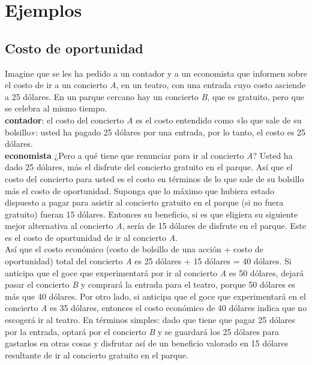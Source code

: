 \section{Ejemplos}

\subsection{Costo de oportunidad}


Imagine que se les ha pedido a un contador y a un economista que informen sobre el costo de ir a un concierto \textit{A}, en un teatro, con una entrada cuyo costo asciende a 25 dólares. En un parque cercano hay un concierto \textit{B}, que es gratuito, pero que se celebra al mismo tiempo.
\\

\textbf{contador}:
el costo del concierto \textit{A} es el costo entendido como «lo que sale de su bolsillo»: usted ha pagado 25 dólares por una entrada, por lo tanto, el costo es 25 dólares.
\\

\textbf{economista}
¿Pero a qué tiene que renunciar para ir al concierto \textit{A}? Usted ha dado 25 dólares, más el disfrute del concierto gratuito en el parque. Así que el costo del concierto para usted es el costo en términos de lo que sale de su bolsillo más el costo de oportunidad.
Suponga que lo máximo que hubiera estado dispuesto a pagar para asistir al concierto gratuito en el parque (si no fuera gratuito) fueran 15 dólares. Entonces su beneficio, si es que eligiera su siguiente mejor alternativa al concierto \textit{A}, sería de 15 dólares de disfrute en el parque. Este es el costo de oportunidad de ir al concierto \textit{A}.
\\

Así que el costo económico (costo de bolsillo de una acción + costo de oportunidad) total del concierto \textit{A} es 25 dólares + 15 dólares = 40 dólares. Si anticipa que el goce que experimentará por ir al concierto \textit{A} es 50 dólares, dejará pasar el concierto \textit{B} y comprará la entrada para el teatro, porque 50 dólares es más que 40 dólares. Por otro lado, si anticipa que el goce que experimentará en el concierto \textit{A} es 35 dólares, entonces el costo económico de 40 dólares indica que no escogerá ir al teatro. En términos simples: dado que tiene que pagar 25 dólares por la entrada, optará por el concierto \textit{B} y se guardará los 25 dólares para gastarlos en otras cosas y disfrutar así de un beneficio valorado en 15 dólares resultante de ir al concierto gratuito en el parque.

